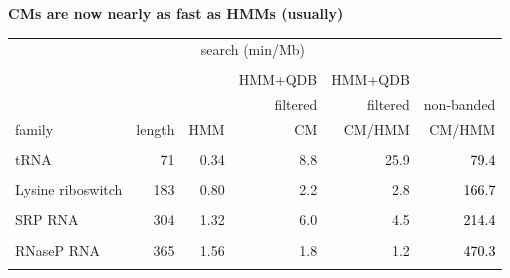 \documentclass[landscape]{slides}
\begin{document}
\begin{slide}
\begin{center}

  \textbf{CMs are now nearly as fast as HMMs (usually)}
\end{center}


\small
\begin{center}
\small
\begin{tabular}{lr|rr|r|r}
                  &        & \multicolumn{2}{c|}{search (min/Mb)} & \multicolumn{2}{c}{}\\ \cline{3-4}
                  &        &        &        &            &         \\

                  &        &        & \textcolor{mypurple}{HMM+QDB}    & \textcolor{mypurple}{HMM+QDB}  & \\
                  &        &        & \textcolor{mypurple}{filtered}   & \textcolor{mypurple}{filtered}& non-banded        \\
family            & length & HMM    & \textcolor{mypurple}{CM}     & \textcolor{mypurple}{CM/HMM} & CM/HMM  \\ \hline
                  &        &        &        &            &         \\
tRNA              & 71     &  0.34  &  \textcolor{mypurple}{8.8}   & \textcolor{mypurple}{25.9} & \textcolor{black}{79.4}\\
                  &        &        &        &            &         \\
Lysine riboswitch & 183    &  0.80  &  \textcolor{mypurple}{2.2}   & \textcolor{mypurple}{2.8}  & \textcolor{black}{166.7}\\
                  &        &        &        &            &         \\
SRP RNA           & 304    &  1.32  &  \textcolor{mypurple}{6.0}   & \textcolor{mypurple}{4.5} & \textcolor{black}{214.4}\\
                  &        &        &        &            &         \\
RNaseP RNA        & 365    &  1.56  &  \textcolor{mypurple}{1.8}   & \textcolor{mypurple}{1.2} & \textcolor{black}{470.3}\\
                  &        &        &        &            &         \\

\end{tabular}
\end{center}

\vfill

\end{slide}
\end{document}

